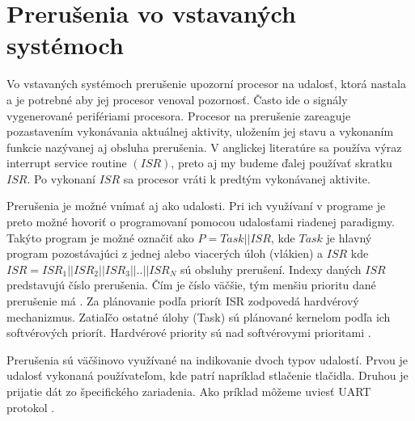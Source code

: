 \section{Prerušenia vo vstavaných systémoch}
\noindent Vo vstavaných systémoch prerušenie upozorní procesor na udalosť, ktorá nastala a je potrebné aby jej procesor venoval pozornosť. Často ide o signály vygenerované perifériami procesora. Procesor na prerušenie zareaguje pozastavením vykonávania aktuálnej aktivity, uložením jej stavu a vykonaním funkcie nazývanej aj obsluha prerušenia. V anglickej literatúre sa používa výraz interrupt service routine \begin{math}(ISR)\end{math}, preto aj my budeme ďalej používať skratku  \begin{math}ISR\end{math}. Po vykonaní  \begin{math}ISR\end{math} sa procesor vráti k predtým vykonávanej aktivite. \par
Prerušenia je možné vnímať aj ako udalosti. Pri ich využívaní v programe je preto možné hovoriť o programovaní pomocou udalosťami riadenej paradigmy. Takýto program je možné označiť ako \begin{math}P=Task || ISR\end{math}, kde \begin{math}Task\end{math} je hlavný program pozostávajúci z jednej alebo viacerých úloh (vlákien) a  \begin{math}ISR\end{math} kde \begin{math}ISR=ISR_1||ISR_2||ISR_3||..||ISR_N\end{math} sú obsluhy prerušení.
Indexy daných \begin{math}ISR\end{math} predstavujú číslo prerušenia. Čím je číslo väčšie, tým menšiu prioritu dané prerušenie má \cite{wangAutomaticDetectionValidation2017}. Za plánovanie podľa priorít ISR zodpovedá
hardvérový mechanizmus. Zatiaľčo ostatné úlohy (Task) sú plánované kernelom podľa ich softvérových priorít. Hardvérové priority sú nad softvérovymi prioritami \cite{leyva-del-foyoCustomInterruptManagement}. \par Prerušenia sú väčšinovo využívané na indikovanie dvoch typov udalostí. Prvou je udalosť vykonaná používateľom, kde patrí napríklad stlačenie tlačidla. Druhou je prijatie dát zo špecifického zariadenia. Ako príklad môžeme uviesť UART protokol .